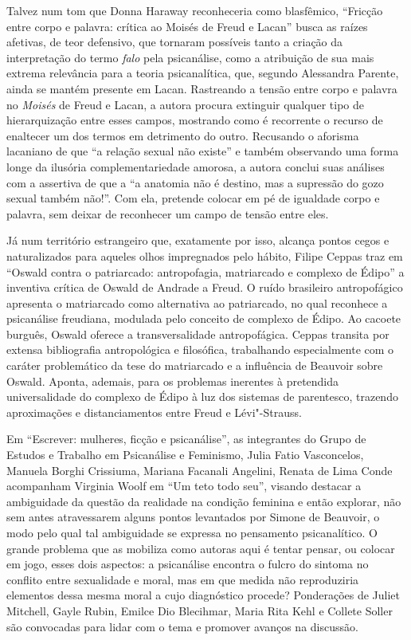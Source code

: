 Talvez num tom que Donna Haraway reconheceria como blasfêmico, ``Fricção
entre corpo e palavra: crítica ao Moisés de Freud e Lacan'' busca as
raízes afetivas, de teor defensivo, que tornaram possíveis tanto a
criação da interpretação do termo \emph{falo} pela psicanálise, como a
atribuição de sua mais extrema relevância para a teoria psicanalítica,
que, segundo Alessandra Parente, ainda se mantém presente em Lacan.
Rastreando a tensão entre corpo e palavra no \emph{Moisés} de Freud e
Lacan, a autora procura extinguir qualquer tipo de hierarquização entre
esses campos, mostrando como é recorrente o recurso de enaltecer um dos
termos em detrimento do outro. Recusando o aforisma lacaniano de que ``a
relação sexual não existe'' e também observando uma forma longe da
ilusória complementariedade amorosa, a autora conclui suas análises com
a assertiva de que a ``a anatomia não é destino, mas a supressão do gozo
sexual também não!''. Com ela, pretende colocar em pé de igualdade corpo
e palavra, sem deixar de reconhecer um campo de tensão entre eles.

Já num território estrangeiro que, exatamente por isso, alcança pontos
cegos e naturalizados para aqueles olhos impregnados pelo hábito, Filipe
Ceppas traz em ``Oswald contra o patriarcado: antropofagia, matriarcado
e complexo de Édipo'' a inventiva crítica de Oswald de Andrade a Freud.
O ruído brasileiro antropofágico apresenta o matriarcado como
alternativa ao patriarcado, no qual reconhece a psicanálise freudiana,
modulada pelo conceito de complexo de Édipo. Ao cacoete burguês, Oswald
oferece a transversalidade antropofágica. Ceppas transita por extensa
bibliografia antropológica e filosófica, trabalhando especialmente com o
caráter problemático da tese do matriarcado e a influência de Beauvoir
sobre Oswald. Aponta, ademais, para os problemas inerentes à pretendida
universalidade do complexo de Édipo à luz dos sistemas de parentesco,
trazendo aproximações e distanciamentos entre Freud e Lévi"-Strauss.

Em ``Escrever: mulheres, ficção e psicanálise'', as integrantes do Grupo
de Estudos e Trabalho em Psicanálise e Feminismo, Julia Fatio
Vasconcelos, Manuela Borghi Crissiuma, Mariana Facanali Angelini, Renata
de Lima Conde acompanham Virginia Woolf em ``Um teto todo seu'', visando
destacar a ambiguidade da questão da realidade na condição feminina e
então explorar, não sem antes atravessarem alguns pontos levantados por
Simone de Beauvoir, o modo pelo qual tal ambiguidade se expressa no
pensamento psicanalítico. O grande problema que as mobiliza como autoras
aqui é tentar pensar, ou colocar em jogo, esses dois aspectos: a
psicanálise encontra o fulcro do sintoma no conflito entre sexualidade e
moral, mas em que medida não reproduziria elementos dessa mesma moral a
cujo diagnóstico procede? Ponderações de Juliet Mitchell, Gayle Rubin,
Emilce Dio Blecihmar, Maria Rita Kehl e Collete Soller são convocadas
para lidar com o tema e promover avanços na discussão.

